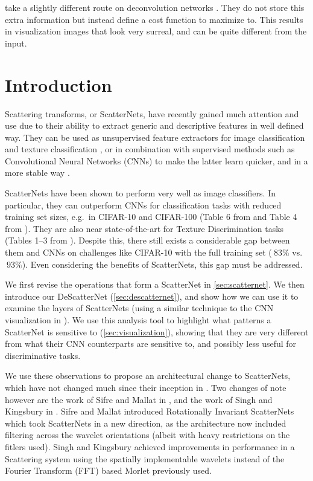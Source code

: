   \citeauthor{mahendran_understanding_2015} take a slightly different route on
  deconvolution networks \citep{mahendran_understanding_2015}. They do not
  store this extra information but instead define a cost function to maximize
  to. This results in visualization images that look very surreal, and can be
  quite different from the input.

\section{Introduction}
\label{sec:intro}
Scattering transforms, or ScatterNets, have recently gained much attention and
use due to their ability to extract generic and descriptive features in well
defined way. They can be used as unsupervised feature extractors
for image classification \cite{bruna_invariant_2013, oyallon_deep_2015, 
singh_dual-tree_2017, singh_multi-resolution_2017} and texture classification
\cite{sifre_rotation_2013}, or in combination with supervised methods such as
Convolutional Neural Networks (CNNs) to make the latter learn quicker, and in
a more stable way \cite{oyallon_scaling_2017}. 

ScatterNets have been shown to perform very well as image classifiers. In
particular, they can outperform CNNs for classification tasks with reduced
training set sizes, e.g.\ in CIFAR-10 and CIFAR-100 (Table 6 from
\cite{oyallon_scaling_2017} and Table 4 from \cite{singh_dual-tree_2017}).  
They are also near state-of-the-art for Texture Discrimination tasks
(Tables 1--3 from \cite{sifre_rotation_2013}). Despite this, there still exists
a considerable gap between them and CNNs on challenges like CIFAR-10 with the
full training set ($~83\%$ vs.\ $~93\%$). Even considering the benefits of
ScatterNets, this gap must be addressed.

We first revise the operations that form a ScatterNet in
\autoref{sec:scatternet}. We then introduce our DeScatterNet
(\autoref{sec:descatternet}), and show how we can use it to examine the layers of ScatterNets
(using a similar technique to the CNN visualization in
\cite{zeiler_visualizing_2014}). We use this analysis tool to
highlight what patterns a ScatterNet is sensitive to
(\autoref{sec:visualization}), showing that they are very
different from what their CNN counterparts are sensitive to, and possibly less
useful for discriminative tasks. 

We use these observations to propose an architectural change to ScatterNets,
which have not changed much since their inception in \cite{mallat_group_2012}. 
Two changes of note however are the work of Sifre and Mallat in
\cite{sifre_rotation_2013}, and the work of Singh and Kingsbury in
\cite{singh_dual-tree_2017}.  Sifre and Mallat introduced Rotationally Invariant
ScatterNets which took ScatterNets in a new direction, as the architecture now
included filtering across the wavelet orientations (albeit with heavy
restrictions on the fitlers used).  Singh and Kingsbury achieved improvements in
performance in a Scattering system using the spatially implementable \DTCWT
\cite{kingsbury_complex_2001} wavelets instead of the Fourier Transform (FFT)
based Morlet previously used.

